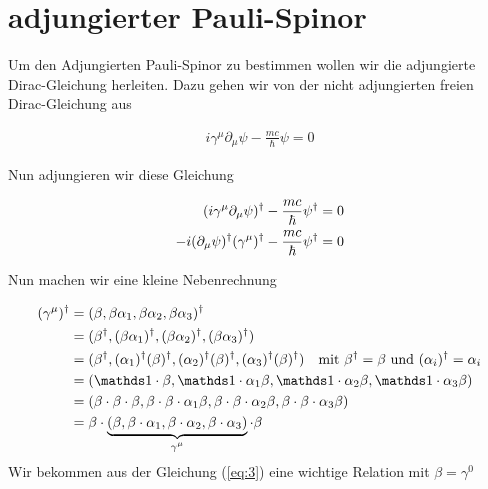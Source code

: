 
\usepackage{amsmath} 





\section*{adjungierter Pauli-Spinor}


Um den Adjungierten Pauli-Spinor zu bestimmen wollen wir die adjungierte Dirac-Gleichung herleiten. Dazu gehen wir von der nicht adjungierten freien Dirac-Gleichung aus

\begin{align}
  \label{eq:1}
  i\gamma^\mu\partial_\mu\psi - \frac{mc}{\hbar}\psi = 0
\end{align}

Nun adjungieren wir diese Gleichung

\begin{align}
  \label{eq:2}
   (i\gamma^\mu\partial_\mu\psi)^\dagger - \frac{mc}{\hbar}\psi^\dagger &= 0 \notag\\
 -i(\partial_\mu\psi)^\dagger(\gamma^\mu)^\dagger - \frac{mc}{\hbar}\psi^\dagger &= 0
\end{align}

Nun machen wir eine kleine Nebenrechnung

\begin{align}
  \label{eq:3}
  (\gamma^\mu)^\dagger &= (\beta,\beta\alpha_1,\beta\alpha_2,\beta\alpha_3)^\dagger \notag \\
&= (\beta^\dagger,(\beta\alpha_1)^\dagger,(\beta\alpha_2)^\dagger,(\beta\alpha_3)^\dagger) \notag \\
&= (\beta^\dagger,(\alpha_1)^\dagger(\beta)^\dagger,(\alpha_2)^\dagger(\beta)^\dagger,(\alpha_3)^\dagger(\beta)^\dagger)\quad \text{mit }\beta^\dagger=\beta \text{ und }(\alpha_i)^\dagger=\alpha_i \notag \\
&= (\mathds 1\cdot \beta,\mathds 1\cdot \alpha_1\beta,\mathds 1\cdot\alpha_2\beta,\mathds 1\cdot\alpha_3\beta)   \notag \\
&= (\beta\cdot\beta\cdot \beta,\beta\cdot\beta\cdot \alpha_1\beta,\beta\cdot\beta\cdot\alpha_2\beta,\beta\cdot\beta\cdot\alpha_3\beta)   \notag \\
&= \beta\cdot\underbr{(\beta,\beta\cdot \alpha_1,\beta\cdot\alpha_2,\beta\cdot\alpha_3)}_{\gamma^\mu} \cdot\beta 
\end{align}
Wir bekommen aus der Gleichung (\ref{eq:3}) eine wichtige Relation mit \(\beta=\gamma^0\)


